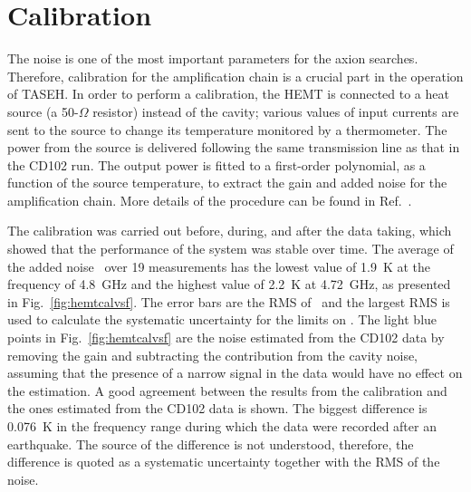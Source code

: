 \section{Calibration} \label{sec:hemtcalibration}
\label{sec:calibration}
The noise is one of the most important parameters for the axion searches. 
Therefore, calibration for the amplification chain is a 
crucial part in the operation of TASEH. In order to perform a calibration, 
the HEMT is connected to a heat source (a 50-$\Omega$ resistor) instead of 
the cavity; 
various values of input currents are sent to the source to change its 
temperature monitored by a thermometer. The power from the source 
is delivered following the same transmission line as that in the CD102 
run. 
The output power is fitted to a first-order polynomial, as a function of 
the source temperature, to extract the gain and added noise for the 
amplification chain. More details of the 
procedure can be found in Ref.~\cite{TASEHInstrumentation}. 

The calibration was carried out before, during, and after the data taking, 
which showed that the performance of the system was stable over time. The 
average of the added noise \ta\ over 19 measurements has the lowest value of 
1.9~K at the frequency of 4.8~GHz and the highest value of 
2.2~K at 4.72~GHz, as presented in Fig.~\ref{fig:hemtcalvsf}. 
The error bars are the RMS of \ta\ and the largest RMS is used to calculate 
the systematic uncertainty for the limits on \gagg. The light blue points in 
Fig.~\ref{fig:hemtcalvsf} are the noise estimated from the CD102 data by 
removing the gain and subtracting the contribution from the cavity noise, 
assuming 
that the presence of a narrow signal in the data would have no effect on the 
estimation. A good agreement between the results from the calibration  
and the ones estimated from the CD102 data is shown. The biggest 
difference is 0.076~K in the frequency range during which the data were 
recorded after an earthquake. The source of the difference is not understood, 
therefore, the difference is quoted as a systematic uncertainty together 
with the RMS of the noise.

